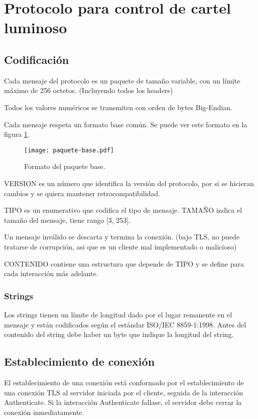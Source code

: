 \section{Protocolo para control de cartel luminoso}\label{sec:protocolo}

\subsection{Codificación}
Cada mensaje del protocolo es un paquete de tamaño variable, con un límite máximo de 256 octetos. (Incluyendo todos los headers)

Todos los valores numéricos se transmiten con orden de bytes Big-Endian.

Cada mensaje respeta un formato base común. Se puede ver este formato en la figura \ref{fig:paquete-base}.

\begin{figure}[h]
	\centering
	\label{fig:paquete-base}
	\texttt{[image: paquete-base.pdf]}
		\caption{Formato del paquete base.}
\end{figure}

VERSION es un número que identifica la versión del protocolo, por si se hicieran cambios y se quiera mantener retrocompatibilidad.

TIPO es un enumerativo que codifica el tipo de mensaje. TAMAÑO indica el tamaño del mensaje, tiene rango [3, 253].

Un mensaje inválido se descarta y termina la conexión. (bajo TLS, no puede tratarse de corrupción, asi que es un cliente mal implementado o malicioso)

CONTENIDO contiene una estructura que depende de TIPO y se define para cada interacción más adelante.

\subsubsection{Strings}
Los strings tienen un límite de longitud dado por el lugar remanente en el mensaje y están codificados según el estándar ISO/IEC 8859-1:1998. Antes del contenido del string debe haber un byte que indique la longitud del string.

\subsection{Establecimiento de conexión}
El establecimiento de una conexión está conformado por el establecimiento de una conexión TLS al servidor iniciada por el cliente, seguida de la interacción Authenticate. Si la interacción Authenticate fallase, el servidor debe cerrar la conexión inmediatamente.

